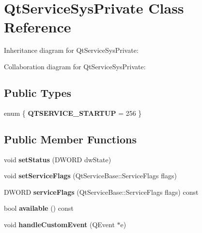 \hypertarget{class_qt_service_sys_private}{}\section{Qt\+Service\+Sys\+Private Class Reference}
\label{class_qt_service_sys_private}


Inheritance diagram for Qt\+Service\+Sys\+Private\+:


Collaboration diagram for Qt\+Service\+Sys\+Private\+:
\subsection*{Public Types}
\begin{DoxyCompactItemize}
\item 
\mbox{\label{class_qt_service_sys_private_a68b461403ad1050c75a568d08b2c4492}} 
enum \{ {\bfseries Q\+T\+S\+E\+R\+V\+I\+C\+E\+\_\+\+S\+T\+A\+R\+T\+UP} = 256
 \}
\end{DoxyCompactItemize}
\subsection*{Public Member Functions}
\begin{DoxyCompactItemize}
\item 
\mbox{\label{class_qt_service_sys_private_a1d33416e766b6f475d36038467bdd69a}} 
void {\bfseries set\+Status} (D\+W\+O\+RD dw\+State)
\item 
\mbox{\label{class_qt_service_sys_private_a8d9929e1406f32ac3f71446ab86d0577}} 
void {\bfseries set\+Service\+Flags} (Qt\+Service\+Base\+::\+Service\+Flags flags)
\item 
\mbox{\label{class_qt_service_sys_private_a8951a293950f651468b69ba142afe017}} 
D\+W\+O\+RD {\bfseries service\+Flags} (Qt\+Service\+Base\+::\+Service\+Flags flags) const
\item 
\mbox{\label{class_qt_service_sys_private_ab023c74e63bc134ff13495891e34f385}} 
bool {\bfseries available} () const
\item 
\mbox{\label{class_qt_service_sys_private_aeb0603830564cf6d730549866020bf0a}} 
void {\bfseries handle\+Custom\+Event} (Q\+Event $\ast$e)
\end{DoxyCompactItemize}
